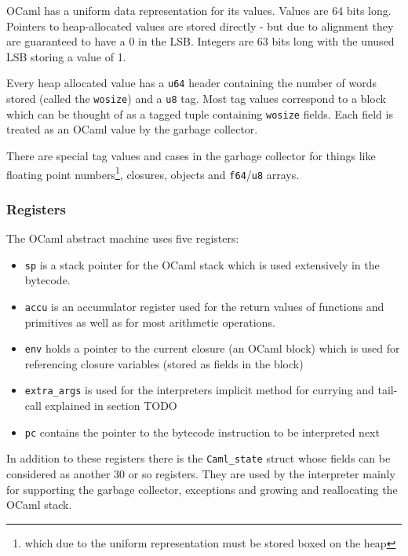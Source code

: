 OCaml has a uniform data representation for its values. Values are 64 bits long. Pointers to
heap-allocated values are
stored directly - but due to alignment they are guaranteed to have a 0 in the LSB. Integers are 63
bits long
with the unused LSB storing a value of 1.

Every heap allocated value has a \texttt{u64} header containing the number of words stored (called
the \texttt{wosize}) and a \texttt{u8} tag. Most tag values correspond to a block which can be
thought of as a tagged tuple containing \texttt{wosize} fields. Each field is treated as an OCaml
value by the garbage collector.

There are special tag values and cases in the garbage collector for things like floating point
numbers\footnote{which due to the uniform representation must be stored boxed on the heap},
closures, objects and \texttt{f64}/\texttt{u8} arrays.

\subsubsection{Registers}

The OCaml abstract machine uses five registers:

\begin{itemize}
    \item \texttt{sp} is a stack pointer for the OCaml stack which is used extensively
          in the bytecode.
    \item \texttt{accu} is an accumulator register used for the return values of functions
          and primitives as well as for most arithmetic operations.
    \item \texttt{env} holds a pointer to the current closure (an OCaml block) which is used for
          referencing
          closure variables (stored as fields in the block)
    \item \texttt{extra\_args} is used for the interpreters implicit method for currying and
          tail-call explained in section TODO
    \item \texttt{pc} contains the pointer to the bytecode instruction to be interpreted next
\end{itemize}

In addition to these registers there is the \texttt{Caml\_state} struct whose fields can be
considered as another 30 or so registers. They are used by the interpreter mainly for supporting
the garbage collector, exceptions and growing and reallocating the OCaml stack.

